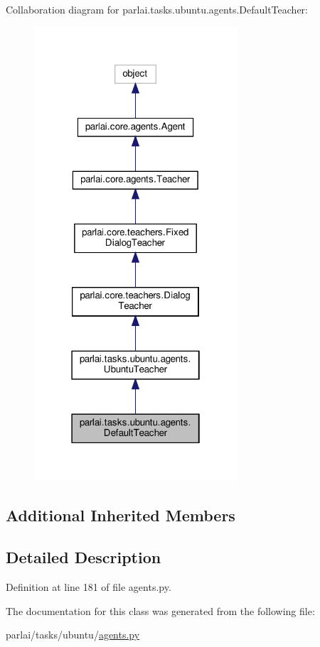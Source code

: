 Collaboration diagram for parlai.\+tasks.\+ubuntu.\+agents.\+Default\+Teacher\+:\nopagebreak
\begin{figure}[H]
\begin{center}
\leavevmode
\includegraphics[width=214pt]{dc/d02/classparlai_1_1tasks_1_1ubuntu_1_1agents_1_1DefaultTeacher__coll__graph}
\end{center}
\end{figure}
\subsection*{Additional Inherited Members}


\subsection{Detailed Description}


Definition at line 181 of file agents.\+py.



The documentation for this class was generated from the following file\+:\begin{DoxyCompactItemize}
\item 
parlai/tasks/ubuntu/\hyperlink{parlai_2tasks_2ubuntu_2agents_8py}{agents.\+py}\end{DoxyCompactItemize}
